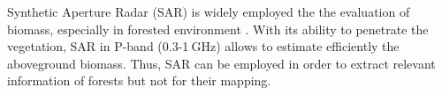Synthetic Aperture Radar (SAR) is widely employed the the evaluation of biomass, especially in forested environment \citep{le1992relating, beaudoin1994retrieval}. With its ability to penetrate the vegetation, SAR in P-band (0.3-1$\:$GHz) allows to estimate efficiently the aboveground biomass. Thus, SAR can be employed in order to extract relevant information of forests but not for their mapping. 

%

